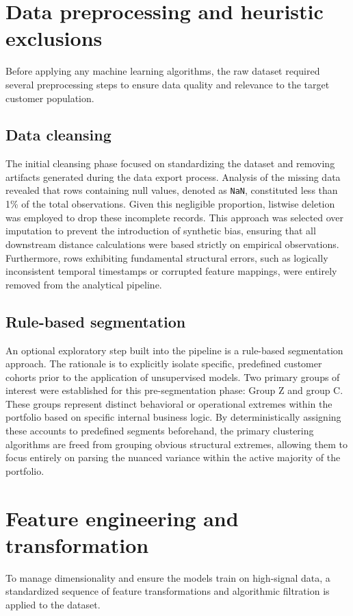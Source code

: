     \section{Data preprocessing and heuristic exclusions}
    \label{sec:preprocessing}
    Before applying any machine learning algorithms, the raw dataset required several preprocessing steps to ensure data quality and relevance to the target customer population.
    
        \subsection{Data cleansing}
        The initial cleansing phase focused on standardizing the dataset and removing artifacts generated during the data export process.
        Analysis of the missing data revealed that rows containing null values, denoted as \texttt{NaN}, constituted less than 1\% of the total observations.
        Given this negligible proportion, listwise deletion was employed to drop these incomplete records.
        This approach was selected over imputation to prevent the introduction of synthetic bias, ensuring that all downstream distance calculations were based strictly on empirical observations.
        Furthermore, rows exhibiting fundamental structural errors, such as logically inconsistent temporal timestamps or corrupted feature mappings, were entirely removed from the analytical pipeline.
        
        \subsection{Rule-based segmentation}
        An optional exploratory step built into the pipeline is a rule-based segmentation approach.
        The rationale is to explicitly isolate specific, predefined customer cohorts prior to the application of unsupervised models.
        Two primary groups of interest were established for this pre-segmentation phase: Group Z and group C. These groups represent distinct behavioral or operational extremes within the portfolio based on specific internal business logic.
        By deterministically assigning these accounts to predefined segments beforehand, the primary clustering algorithms are freed from grouping obvious structural extremes, allowing them to focus entirely on parsing the nuanced variance within the active majority of the portfolio.
        
    \section{Feature engineering and transformation}
    \label{sec:feature_engineering}
    To manage dimensionality and ensure the models train on high-signal data, a standardized sequence of feature transformations and algorithmic filtration is applied to the dataset.

